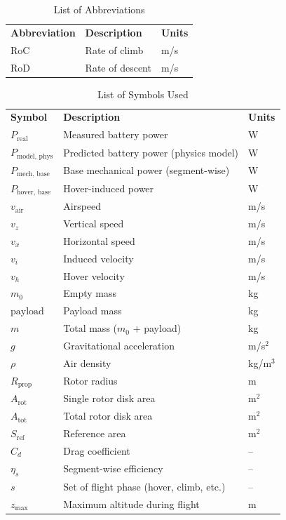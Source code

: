 \begin{table}[htbp]
\centering
\caption{List of Abbreviations}
\begin{tabular}{lll}
\textbf{Abbreviation} & \textbf{Description} & \textbf{Units} \\
$ \text{RoC} $ & Rate of climb & m/s \\
$ \text{RoD} $ & Rate of descent & m/s \\
\end{tabular}
\label{tab:abbreviations}
\end{table}

\begin{table}[htbp]
\centering
\caption{List of Symbols Used}
\begin{tabular}{lll}
\textbf{Symbol} & \textbf{Description} & \textbf{Units} \\
$ P_{\text{real}} $ & Measured battery power & W \\
$ P_{\text{model, phys}} $ & Predicted battery power (physics model) & W \\
$ P_{\text{mech, base}} $ & Base mechanical power (segment-wise) & W \\
$ P_{\text{hover, base}} $ & Hover-induced power & W \\
$ v_{\text{air}} $ & Airspeed & m/s \\
$ v_z $ & Vertical speed & m/s \\
$ v_x $ & Horizontal speed & m/s \\
$ v_i $ & Induced velocity & m/s \\
$ v_h $ & Hover velocity & m/s \\
$ m_0 $ & Empty mass & kg \\
$ \text{payload} $ & Payload mass & kg \\
$ m $ & Total mass ($m_0$ + payload) & kg \\
$ g $ & Gravitational acceleration & m/s$^2$ \\
$ \rho $ & Air density & kg/m$^3$ \\
$ R_{\text{prop}} $ & Rotor radius & m \\
$ A_{\text{rot}} $ & Single rotor disk area & m$^2$ \\
$ A_{\text{tot}} $ & Total rotor disk area & m$^2$ \\
$ S_{\text{ref}} $ & Reference area & m$^2$ \\
$ C_d $ & Drag coefficient & -- \\
$ \eta_s $ & Segment-wise efficiency & -- \\
$ s $ & Set of flight phase (hover, climb, etc.) & -- \\
$ z_{\text{max}} $ & Maximum altitude during flight & m \\
\end{tabular}
\label{tab:abbreviations}
\end{table}